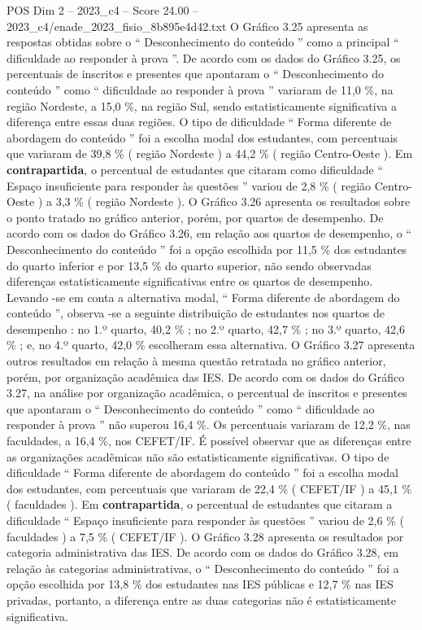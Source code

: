 \begin{textsample}{POS Dim 2 – 2023\_c4 – Score 24.00 – 2023\_c4/enade\_2023\_fisio\_8b895e4d42.txt}
O Gráfico 3.25 apresenta as respostas obtidas sobre o “ Desconhecimento do conteúdo ” como a principal “ dificuldade ao responder à prova ”.
De acordo com os dados do Gráfico 3.25, os percentuais de inscritos e presentes que apontaram o “ Desconhecimento do conteúdo ” como “ dificuldade ao responder à prova ” variaram de 11,0 \%, na região Nordeste, a 15,0 \%, na região Sul, sendo estatisticamente significativa a diferença entre essas duas regiões.
O tipo de dificuldade “ Forma diferente de abordagem do conteúdo ” foi a escolha modal dos estudantes, com percentuais que variaram de 39,8 \% ( região Nordeste ) a 44,2 \% ( região Centro-Oeste ).
Em \textbf{contrapartida}, o percentual de estudantes que citaram como dificuldade “ Espaço insuficiente para responder às questões ” variou de 2,8 \% ( região Centro-Oeste ) a 3,3 \% ( região Nordeste ).
O Gráfico 3.26 apresenta os resultados sobre o ponto tratado no gráfico anterior, porém, por quartos de desempenho.
De acordo com os dados do Gráfico 3.26, em relação aos quartos de desempenho, o “ Desconhecimento do conteúdo ” foi a opção escolhida por 11,5 \% dos estudantes do quarto inferior e por 13,5 \% do quarto superior, não sendo observadas diferenças estatisticamente significativas entre os quartos de desempenho.
Levando -se em conta a alternativa modal, “ Forma diferente de abordagem do conteúdo ”, observa -se a seguinte distribuição de estudantes nos quartos de desempenho : no 1.º quarto, 40,2 \% ; no 2.º quarto, 42,7 \% ; no 3.º quarto, 42,6 \% ; e, no 4.º quarto, 42,0 \% escolheram essa alternativa.
O Gráfico 3.27 apresenta outros resultados em relação à mesma questão retratada no gráfico anterior, porém, por organização acadêmica das IES.
De acordo com os dados do Gráfico 3.27, na análise por organização acadêmica, o percentual de inscritos e presentes que apontaram o “ Desconhecimento do conteúdo ” como “ dificuldade ao responder à prova ” não superou 16,4 \%.
Os percentuais variaram de 12,2 \%, nas faculdades, a 16,4 \%, nos CEFET/IF.
É possível observar que as diferenças entre as organizações acadêmicas não são estatisticamente significativas.
O tipo de dificuldade “ Forma diferente de abordagem do conteúdo ” foi a escolha modal dos estudantes, com percentuais que variaram de 22,4 \% ( CEFET/IF ) a 45,1 \% ( faculdades ).
Em \textbf{contrapartida}, o percentual de estudantes que citaram a dificuldade “ Espaço insuficiente para responder às questões ” variou de 2,6 \% ( faculdades ) a 7,5 \% ( CEFET/IF ).
O Gráfico 3.28 apresenta os resultados por categoria administrativa das IES.
De acordo com os dados do Gráfico 3.28, em relação às categorias administrativas, o “ Desconhecimento do conteúdo ” foi a opção escolhida por 13,8 \% dos estudantes nas IES públicas e 12,7 \% nas IES privadas, portanto, a diferença entre as duas categorias não é estatisticamente significativa.

\end{textsample}
